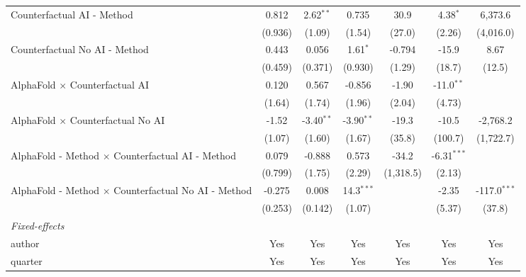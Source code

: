 \begin{tabular}{lcccccc}
   Counterfactual AI - Method                                 & 0.812   & 2.62$^{**}$  & 0.735        & 30.9      & 4.38$^{*}$    & 6,373.6\\   
                                                              & (0.936) & (1.09)       & (1.54)       & (27.0)    & (2.26)        & (4,016.0)\\   
   Counterfactual No AI - Method                              & 0.443   & 0.056        & 1.61$^{*}$   & -0.794    & -15.9         & 8.67\\   
                                                              & (0.459) & (0.371)      & (0.930)      & (1.29)    & (18.7)        & (12.5)\\   
   AlphaFold $\times$ Counterfactual AI                       & 0.120   & 0.567        & -0.856       & -1.90     & -11.0$^{**}$  &   \\   
                                                              & (1.64)  & (1.74)       & (1.96)       & (2.04)    & (4.73)        &   \\   
   AlphaFold $\times$ Counterfactual No AI                    & -1.52   & -3.40$^{**}$ & -3.90$^{**}$ & -19.3     & -10.5         & -2,768.2\\   
                                                              & (1.07)  & (1.60)       & (1.67)       & (35.8)    & (100.7)       & (1,722.7)\\   
   AlphaFold - Method $\times$ Counterfactual AI - Method     & 0.079   & -0.888       & 0.573        & -34.2     & -6.31$^{***}$ &   \\   
                                                              & (0.799) & (1.75)       & (2.29)       & (1,318.5) & (2.13)        &   \\   
   AlphaFold - Method $\times$ Counterfactual No AI - Method  & -0.275  & 0.008        & 14.3$^{***}$ &           & -2.35         & -117.0$^{***}$\\   
                                                              & (0.253) & (0.142)      & (1.07)       &           & (5.37)        & (37.8)\\   
   \midrule
   \emph{Fixed-effects}\\
   author                                                     & Yes     & Yes          & Yes          & Yes       & Yes           & Yes\\  
   quarter                                                    & Yes     & Yes          & Yes          & Yes       & Yes           & Yes\\  

\end{tabular}
